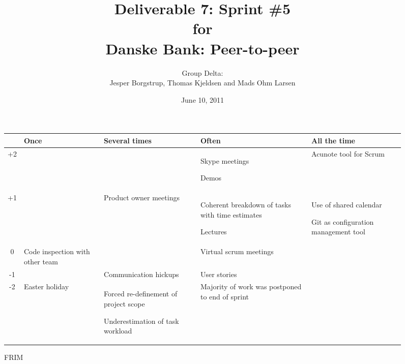 \documentclass[a4paper,11pt]{article}
\title{Deliverable 7: Sprint \#5\\\small{for}\\\small{Danske Bank: Peer-to-peer}}
\author{ Group Delta:\\Jesper Borgstrup, Thomas Kjeldsen and Mads Ohm Larsen }
\date{June 10, 2011}
\begin{document}
\ifpdf
{}
\else
{}
\fi

\maketitle

\begin{figure}
	\centering
	\begin{tabular}{|c|p{3cm}|p{3cm}|p{3cm}|p{3cm}|}
	\hline
		& Once & Several times & Often & All the time \\\hline
	+2  & & & Skype meetings \par\vspace{.3cm} Demos & Acunote tool for Scrum \\\hline
	+1  & & Product owner meetings & Coherent breakdown of tasks with time estimates \par\vspace{.3cm} Lectures & Use of shared calendar \par\vspace{.3cm} Git as configuration management tool \\\hline
	 0  & Code inspection with other team & & Virtual scrum meetings & \\\hline
	-1  & & Communication hickups & User stories & \\\hline
	-2  & Easter holiday & Forced re-definement of project scope \par\vspace{.3cm} Underestimation of task workload & Majority of work was postponed to end of sprint & \\\hline
	\end{tabular}	
	\caption{FRIM}
\end{figure}
\end{document}

